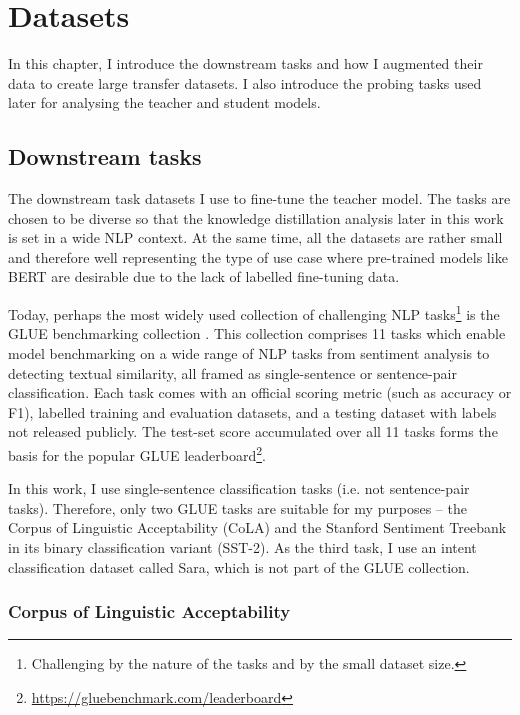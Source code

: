\documentclass[bsc,frontabs,twoside,singlespacing,parskip,deptreport]{infthesis}
\begin{document}
\chapter{Datasets}{
  \label{chap:datasets}

  In this chapter, I introduce the downstream tasks and how I augmented their data to create large transfer datasets. I also introduce the probing tasks used later for analysing the teacher and student models.

  \section{Downstream tasks}{
    The downstream task datasets I use to fine-tune the teacher model. The tasks are chosen to be diverse so that the knowledge distillation analysis later in this work is set in a wide NLP context. At the same time, all the datasets are rather small and therefore well representing the type of use case where pre-trained models like BERT are desirable due to the lack of labelled fine-tuning data.

    Today, perhaps the most widely used collection of challenging NLP tasks\footnote{Challenging by the nature of the tasks and by the small dataset size.} is the GLUE benchmarking collection \citep{Wang_2018}. 
    This collection comprises 11 tasks which enable model benchmarking on a wide range of NLP tasks from sentiment analysis to detecting textual similarity, all framed as single-sentence or sentence-pair classification.
    Each task comes with an official scoring metric (such as accuracy or F1), labelled training and evaluation datasets, and a testing dataset with labels not released publicly.
    The test-set score accumulated over all 11 tasks forms the basis for the popular GLUE leaderboard\footnote{\url{https://gluebenchmark.com/leaderboard}}.
    
    In this work, I use single-sentence classification tasks (i.e. not sentence-pair tasks). Therefore, only two GLUE tasks are suitable for my purposes -- the Corpus of Linguistic Acceptability (CoLA) and the Stanford Sentiment Treebank in its binary classification variant (SST-2). As the third task, I use an intent classification dataset called Sara, which is not part of the GLUE collection.

    \subsection{Corpus of Linguistic Acceptability}{
      \label{sec:datasets-CoLA}

}}}
\end{document}
